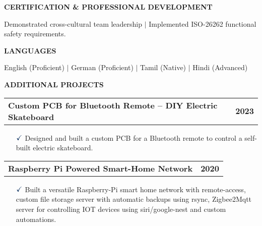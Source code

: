 \documentclass[a4paper,10pt]{article}
\begin{document}
\noindent{\rule{\linewidth}{1.4pt}}
\textbf{CERTIFICATION \& PROFESSIONAL DEVELOPMENT}

\vspace{-0.1cm}
\noindent{\rule{\linewidth}{0.01cm}}

\noindent Demonstrated cross-cultural team leadership $\vert$ Implemented ISO-26262 functional safety requirements.

\noindent{\rule{\linewidth}{1.4pt}}
\textbf{LANGUAGES}

\vspace{-0.1cm}
\noindent{\rule{\linewidth}{0.01cm}}

\noindent English (Proficient) {$\vert$} German (Proficient) $\vert$ Tamil (Native) $\vert$ Hindi (Advanced)

\noindent{\rule{\linewidth}{1.4pt}}
\textbf{ADDITIONAL PROJECTS}

\vspace{-0.1cm}
\noindent{\rule{\linewidth}{0.01cm}}

\vspace{0.3cm}
\noindent
\begin{tabular}{ @{\hskip 0pt}m{} >{\raggedleft\arraybackslash}p{} }
    \noindent\textbf{Custom PCB for Bluetooth Remote – DIY Electric Skateboard} & \textbf{2023}
\end{tabular}

{\small
\begin{itemize}
    \item[$\textcolor{highlightcolor}{\checkmark}$]  
    Designed and built a custom PCB for a Bluetooth remote to control a self-built electric skateboard.
\end{itemize}
}

\vspace{0.3cm}
\noindent
\begin{tabular}{ @{\hskip 0pt}m{} >{\raggedleft\arraybackslash}p{} }
    \noindent\textbf{Raspberry Pi Powered Smart-Home Network} & \textbf{2020}
\end{tabular}

{\small
\begin{itemize}
    \item[$\textcolor{highlightcolor}{\checkmark}$]  
            Built a versatile Raspberry-Pi smart home network with
            remote-access, custom file storage server with automatic backups
            using rsync, Zigbee2Mqtt server for controlling IOT devices using
            siri/google-nest and custom automations.
\end{itemize}
}
\end{document}
